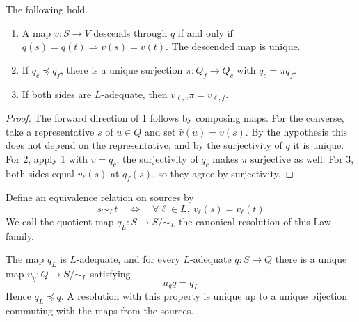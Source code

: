 \begin{lemma}\label{lem:3.2}

The following hold.

\begin{enumerate}
\item A map $v:S\to V$ descends through $q$ if and only if
$q(s)=q(t)\Rightarrow v(s)=v(t)$. The descended map is unique.
\item If $q_c\preceq q_f$, there is a unique surjection $\pi:Q_f\to Q_c$ with
$q_c=\pi q_f$.
\item If both sides are $L$-adequate, then $\bar v_{\ell,c}\pi=\bar v_{\ell,f}$.
\end{enumerate}

\end{lemma}

\begin{proof}

The forward direction of 1 follows by composing maps. For the converse, take a
representative $s$ of $u\in Q$ and set $\bar v(u)=v(s)$. By the hypothesis this does
not depend on the representative, and by the surjectivity of $q$ it is unique.
For 2, apply 1 with $v=q_c$; the surjectivity of $q_c$ makes $\pi$ surjective as well.
For 3, both sides equal $v_\ell(s)$ at $q_f(s)$, so they agree by surjectivity.

\end{proof}

\begin{definition}\label{def:3.3}

Define an equivalence relation on sources by
\begin{equation*}
s\sim_L t
\quad\Longleftrightarrow\quad
\forall\ell\in L,\ v_\ell(s)=v_\ell(t)
\tag{3.3}\label{eq:3.3}
\end{equation*}
We call the quotient map $q_L:S\to S/{\sim_L}$ the canonical resolution of this
Law family.

\end{definition}

\begin{theorem}\label{thm:3.4}

The map $q_L$ is $L$-adequate, and for every $L$-adequate $q:S\to Q$ there is a
unique map $u_q:Q\to S/{\sim_L}$ satisfying
\begin{equation*}
u_q q=q_L
\tag{3.4}\label{eq:3.4}
\end{equation*}
Hence $q_L\preceq q$.
A resolution with this property is unique up to a unique bijection commuting with the
maps from the sources.

\end{theorem}

